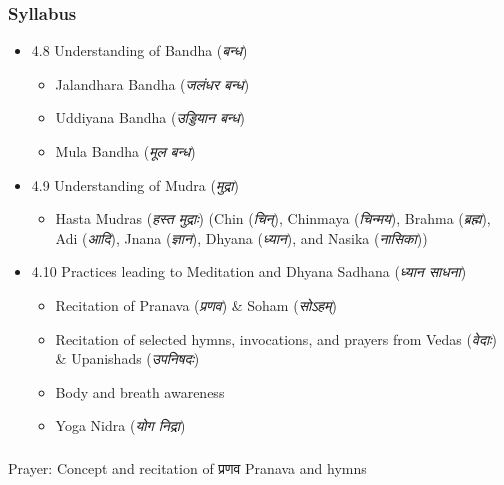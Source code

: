 \begin{frame}[fragile]\frametitle{Syllabus}

\begin{itemize}
\item 4.8  Understanding of Bandha (\textit{बन्ध})
	\begin{itemize}
	\item Jalandhara Bandha (\textit{जलंधर बन्ध})
	\item Uddiyana Bandha (\textit{उड्डियान बन्ध})
	\item Mula Bandha (\textit{मूल बन्ध})
	\end{itemize}

\item 4.9  Understanding of Mudra (\textit{मुद्रा})   
	\begin{itemize}
	\item Hasta Mudras (\textit{हस्त मुद्राः}) (Chin (\textit{चिन्}), Chinmaya (\textit{चिन्मय}), Brahma (\textit{ब्रह्म}), Adi (\textit{आदि}), Jnana (\textit{ज्ञान}), Dhyana (\textit{ध्यान}), and Nasika (\textit{नासिका}))
	\end{itemize}
	
\item 4.10  Practices leading to Meditation and Dhyana Sadhana (\textit{ध्यान साधना})   
	\begin{itemize}
	\item  Recitation of Pranava (\textit{प्रणव}) \& Soham (\textit{सोऽहम्}) 
	\item  Recitation of selected hymns, invocations, and prayers from Vedas (\textit{वेदाः}) \& Upanishads (\textit{उपनिषदः})
	\item  Body and breath awareness  
	\item  Yoga Nidra (\textit{योग निद्रा})
	\end{itemize}
	
\end{itemize}
\end{frame}


\begin{frame}[fragile]\frametitle{}
\begin{center}
{\Large  Prayer: Concept and recitation of प्रणव Pranava and hymns}
\end{center}
\end{frame}


